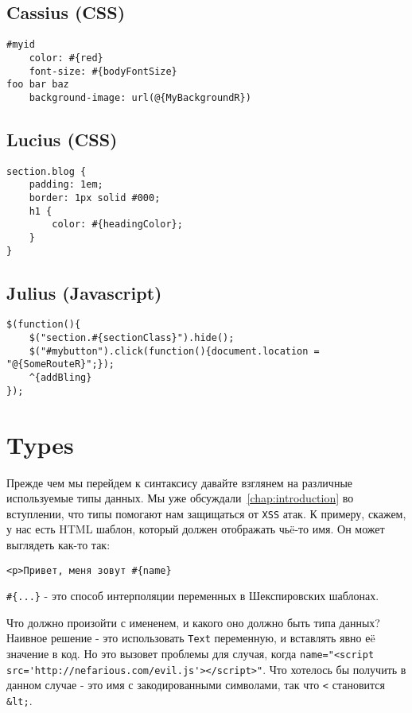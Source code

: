 \subsection{Cassius (CSS)}

\begin{lstlisting}
#myid
    color: #{red}
    font-size: #{bodyFontSize}
foo bar baz
    background-image: url(@{MyBackgroundR})
\end{lstlisting}

\subsection{Lucius (CSS)}

\begin{lstlisting}
section.blog {
    padding: 1em;
    border: 1px solid #000;
    h1 {
        color: #{headingColor};
    }
}
\end{lstlisting}

\subsection{Julius (Javascript)}

\begin{lstlisting}
$(function(){
    $("section.#{sectionClass}").hide();
    $("#mybutton").click(function(){document.location = "@{SomeRouteR}";});
    ^{addBling}
});
\end{lstlisting}

\section{Types}

Прежде чем мы перейдем к синтаксису давайте взглянем на различные используемые 
типы данных. Мы уже обсуждали~\ref{chap:introduction} во вступлении, что типы 
помогают нам защищаться от \texttt{XSS} атак. К примеру, скажем, 
у нас есть HTML шаблон, который должен отображать чьë-то имя. Он может выглядеть
как-то так:

\begin{lstlisting}
<p>Привет, меня зовут #{name}
\end{lstlisting}


\lstinline!#{...}! - это способ интерполяции переменных в Шекспировских шаблонах.

Что должно произойти с имененем, и какого оно должно быть типа данных?
Наивное решение - это использовать \texttt{Text} переменную, и вставлять 
явно еë значение в код.  
Но это вызовет проблемы для случая, когда
\lstinline!name="<script src='http://nefarious.com/evil.js'></script>"!.
Что хотелось бы получить в данном случае - это имя с закодированными символами, 
так что 
\lstinline!<! становится \lstinline!&lt;!.

